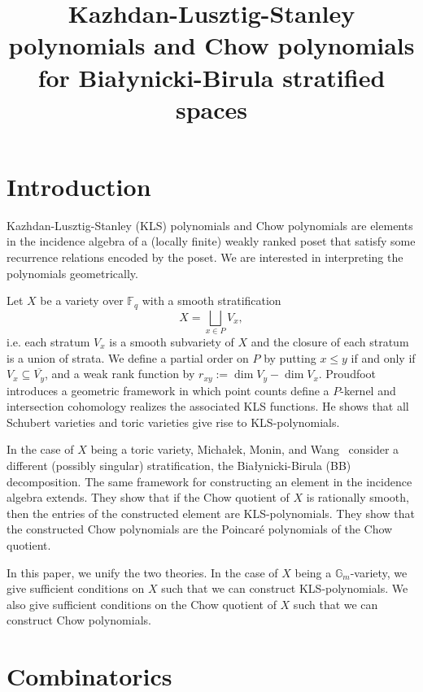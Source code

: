 \documentclass[a4paper]{article}
\title{\bf{
                Kazhdan-Lusztig-Stanley polynomials and Chow polynomials for Bia{\l}ynicki-Birula stratified spaces
}}
\newcommand\Gm{{\mathbb{G}_m}}
\begin{document}
\maketitle
\vspace{-3.5em}
%

\thispagestyle{empty}
\tableofcontents
\listoftodos

\section{Introduction}

Kazhdan-Lusztig-Stanley (KLS) polynomials and Chow polynomials are elements in the incidence algebra of a (locally finite) weakly ranked poset that satisfy some recurrence relations encoded by the poset. 
We are interested in interpreting the polynomials geometrically.

Let $X$ be a variety over $\mathbb{F}_q$ with a smooth stratification 
\[
        X=\bigsqcup _{x\in P}V_x,
\]
i.e. each stratum $V_x$ is a smooth subvariety of $X$ and the closure of each stratum is a union of strata. We define a partial order on $P$ by putting $x\leq y$ if and only if $V_x\subseteq \overline{V_y}$, and a weak rank function by $r_{xy}:=\dim V_y - \dim V_x$.
Proudfoot~\cite{Proudfoot2018} introduces a geometric framework in which point counts define a $P$-kernel and intersection cohomology realizes the associated KLS functions. He shows that all Schubert varieties and toric varieties give rise to KLS-polynomials.

In the case of $X$ being a toric variety, Micha{\l}ek, Monin, and Wang~\cite{MichalekMoninWang2026} consider a different (possibly singular) stratification, the Bia{\l}ynicki-Birula (BB) decomposition. The same framework for constructing an element in the incidence algebra extends. They show that if the Chow quotient of $X$ is rationally smooth, then the entries of the constructed element are KLS-polynomials.
They show that the constructed Chow polynomials are the Poincar\'e polynomials of the Chow quotient.

In this paper, we unify the two theories. In the case of $X$ being a $\Gm$-variety, we give sufficient conditions on $X$ such that we can construct KLS-polynomials. We also give sufficient conditions on the Chow quotient of $X$ such that we can construct Chow polynomials.

\section{Combinatorics}
\end{document}
